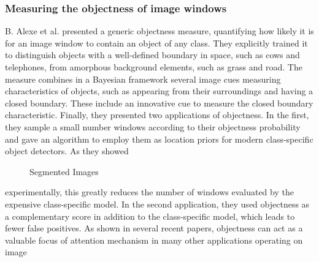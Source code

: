\subsubsection{Measuring the objectness of image windows}
B. Alexe et al. \cite{1} presented a generic objectness measure, quantifying how likely it is for an image window to contain an object of any
class. They explicitly trained it to distinguish objects with a well-defined boundary in space, such as cows and telephones, from amorphous
background elements, such as grass and road. The measure combines in a Bayesian framework several image cues measuring characteristics of objects, such as appearing
from their surroundings and having a closed boundary. These include an
innovative cue to measure the closed boundary characteristic. Finally, they presented two applications of objectness. In the first, they sample a small number windows according to their
objectness probability and gave an algorithm to employ them as location priors for modern class-specific object detectors. As they showed 
\begin{figure}[!htb]
    \centering
    \label{obj1}
    \label{obj2}
  \caption{Segmented Images}
        \vspace{-.5cm}
  \label{objectnessfig} 
\end{figure}
experimentally, this greatly reduces the number of windows evaluated by the expensive class-specific model. In the second application,
they used objectness as a complementary score in addition to the class-specific model, which leads to fewer false positives. As shown in
several recent papers, objectness can act as a valuable focus of attention mechanism in many other applications operating on image
